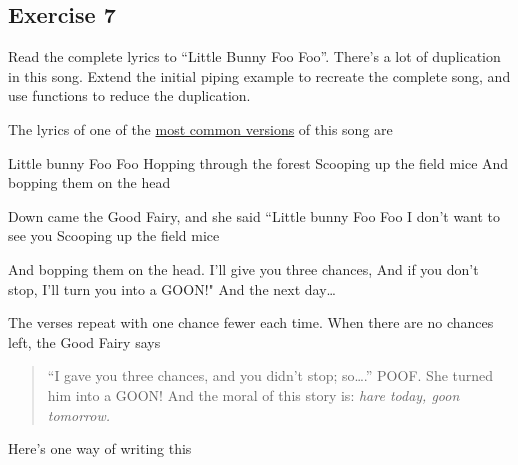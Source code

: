 \documentclass[]{book}
\theoremstyle{definition}
\theoremstyle{definition}
\theoremstyle{definition}
\theoremstyle{remark}
\begin{document}
\hypertarget{exercise-7-4}{%
\subsection{Exercise 7}\label{exercise-7-4}}

Read the complete lyrics to ``Little Bunny Foo Foo''. There's a lot of
duplication in this song. Extend the initial piping example to recreate
the complete song, and use functions to reduce the duplication.

The lyrics of one of the
\href{https://en.wikipedia.org/wiki/Little_Bunny_Foo_Foo}{most common
versions} of this song are

Little bunny Foo Foo Hopping through the forest Scooping up the field
mice And bopping them on the head

Down came the Good Fairy, and she said ``Little bunny Foo Foo I don't
want to see you Scooping up the field mice

And bopping them on the head. I'll give you three chances, And if you
don't stop, I'll turn you into a GOON!" And the next day\ldots{}

The verses repeat with one chance fewer each time. When there are no
chances left, the Good Fairy says

\begin{quote}
``I gave you three chances, and you didn't stop; so\ldots{}.'' POOF. She
turned him into a GOON! And the moral of this story is: \emph{hare
today, goon tomorrow.}
\end{quote}

Here's one way of writing this
\end{document}

